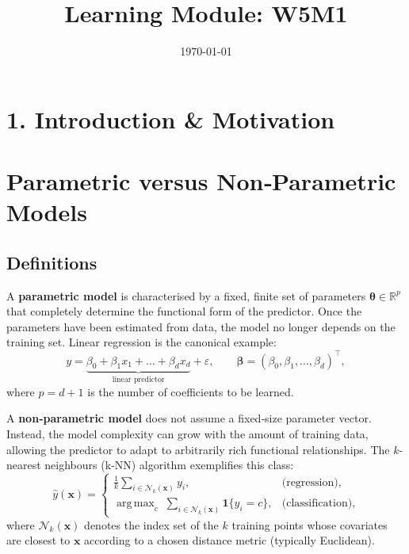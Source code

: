 \documentclass[12pt, a4paper]{article}
\title{Learning Module: W5M1}
\author{}
\date{\today}
\providecommand{\operatorname}[1]{\mathop{\mathrm{#1}}\nolimits}
\begin{document}
\maketitle
\thispagestyle{empty}
\newpage

\tableofcontents
\newpage


\section{1. Introduction \& Motivation}

\section{Parametric versus Non‑Parametric Models}

\subsection{Definitions}
A \textbf{parametric model} is characterised by a fixed, finite set of parameters \(\boldsymbol \theta \in \mathbb R^{p}\) that completely determine the functional form of the predictor.  Once the parameters have been estimated from data, the model no longer depends on the training set.  Linear regression is the canonical example:
\[
y = \underbrace{\beta_{0} + \beta_{1}x_{1} + \dots + \beta_{d}x_{d}}_{\text{linear predictor}} + \varepsilon ,\qquad 
\boldsymbol\beta = (\beta_{0},\beta_{1},\dots ,\beta_{d})^{\!\top},
\]
where \(p = d+1\) is the number of coefficients to be learned.

A \textbf{non‑parametric model} does not assume a fixed‑size parameter vector.  Instead, the model complexity can grow with the amount of training data, allowing the predictor to adapt to arbitrarily rich functional relationships.  The \(k\)-nearest neighbours (k‑NN) algorithm exemplifies this class:
\[
\hat y(\mathbf{x}) = 
\begin{cases}
\displaystyle\frac{1}{k}\sum_{i\in\mathcal N_{k}(\mathbf{x})} y_{i}, & \text{(regression)},\\[2ex]
\displaystyle\operatorname{arg\,max}_{c}\;\sum_{i\in\mathcal N_{k}(\mathbf{x})}\mathbf 1\{y_{i}=c\}, & \text{(classification)},
\end{cases}
\]
where \(\mathcal N_{k}(\mathbf{x})\) denotes the index set of the \(k\) training points whose covariates are closest to \(\mathbf{x}\) according to a chosen distance metric (typically Euclidean).
\end{document}
